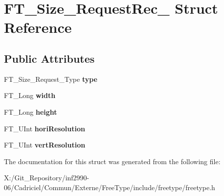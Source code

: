 \hypertarget{struct_f_t___size___request_rec__}{\section{F\-T\-\_\-\-Size\-\_\-\-Request\-Rec\-\_\- Struct Reference}
\label{struct_f_t___size___request_rec__}
}
\subsection*{Public Attributes}
\begin{DoxyCompactItemize}
\item 
\hypertarget{struct_f_t___size___request_rec___a7644b04dd2b26c0698df558775320494}{F\-T\-\_\-\-Size\-\_\-\-Request\-\_\-\-Type {\bfseries type}}\label{struct_f_t___size___request_rec___a7644b04dd2b26c0698df558775320494}

\item 
\hypertarget{struct_f_t___size___request_rec___a7b044d36af318b053d5e3939eb0d5039}{F\-T\-\_\-\-Long {\bfseries width}}\label{struct_f_t___size___request_rec___a7b044d36af318b053d5e3939eb0d5039}

\item 
\hypertarget{struct_f_t___size___request_rec___af8142450d8d032e1870d758cdcfa51a9}{F\-T\-\_\-\-Long {\bfseries height}}\label{struct_f_t___size___request_rec___af8142450d8d032e1870d758cdcfa51a9}

\item 
\hypertarget{struct_f_t___size___request_rec___a3a85704d13561d9db53aa60f7805ec73}{F\-T\-\_\-\-U\-Int {\bfseries hori\-Resolution}}\label{struct_f_t___size___request_rec___a3a85704d13561d9db53aa60f7805ec73}

\item 
\hypertarget{struct_f_t___size___request_rec___a86601c38d91064b6efe256a9e99c56f4}{F\-T\-\_\-\-U\-Int {\bfseries vert\-Resolution}}\label{struct_f_t___size___request_rec___a86601c38d91064b6efe256a9e99c56f4}

\end{DoxyCompactItemize}


The documentation for this struct was generated from the following file\-:\begin{DoxyCompactItemize}
\item 
X\-:/\-Git\-\_\-\-Repository/inf2990-\/06/\-Cadriciel/\-Commun/\-Externe/\-Free\-Type/include/freetype/freetype.\-h\end{DoxyCompactItemize}
